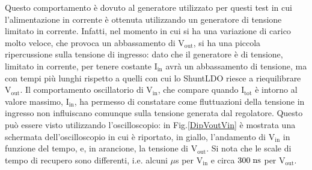Questo comportamento è dovuto al generatore utilizzato per questi test in cui l'alimentazione in corrente è ottenuta utilizzando un generatore di tensione limitato in corrente. 
Infatti, nel momento in cui si ha una variazione di carico molto veloce, che provoca un abbassamento di $\mathrm{V_{out}}$, si ha una piccola ripercussione sulla tensione di ingresso: dato che il generatore è di tensione, limitato in corrente, per tenere costante $\mathrm{I_{in}}$ avrà un abbassamento di tensione, ma con tempi più lunghi rispetto a quelli con cui lo ShuntLDO riesce a riequilibrare $\mathrm{V_{out}}$.
Il comportamento oscillatorio di $\mathrm{V_{in}}$, che compare quando $\mathrm{I_{tot}}$ è intorno al valore massimo, $\mathrm{I_{in}}$, ha permesso di constatare come fluttuazioni della tensione in ingresso non influiscano comunque sulla tensione generata dal regolatore.
Questo può essere visto utilizzando l'oscilloscopio: in Fig.\ref{DipVoutVin} è mostrata una schermata dell'oscilloscopio in cui è riportato, in giallo, l'andamento di $\mathrm{V_{in}}$ in funzione del tempo, e, in arancione, la tensione di $\mathrm{V_{out}}$.
Si nota che le scale di tempo di recupero sono differenti, i.e. alcuni $\mu$s per $\mathrm{V_{in}}$ e circa $300 \rm \; ns$ per $\mathrm{V_{out}}$.


